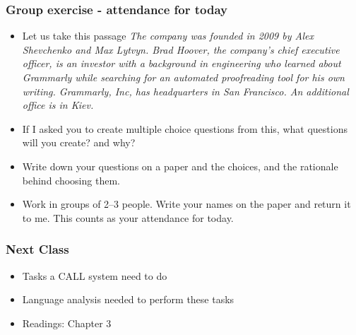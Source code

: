 \documentclass{beamer}
\begin{document}
\begin{frame}
\frametitle{Group exercise - attendance for today}
\begin{itemize}
\item Let us take this passage \small{\textit{The company was founded in 2009 by Alex Shevchenko and Max Lytvyn. Brad Hoover, the company's chief executive officer, is an investor with a background in engineering who learned about Grammarly while searching for an automated proofreading tool for his own writing. Grammarly, Inc, has headquarters in San Francisco. An additional office is in Kiev.}}
\normalsize \item If I asked you to create multiple choice questions from this, what questions will you create? and why? 
\item Write down your questions on a paper and the choices, and the rationale behind choosing them.
\item Work in groups of 2--3 people. Write your names on the paper and return it to me. This counts as your attendance for today. 
\end{itemize}
\end{frame}

\begin{frame}
\frametitle{Next Class}
\begin{itemize}
\item Tasks a CALL system need to do
\item Language analysis needed to perform these tasks
\item Readings: Chapter 3
\end{itemize}
\end{frame}
\end{document}
